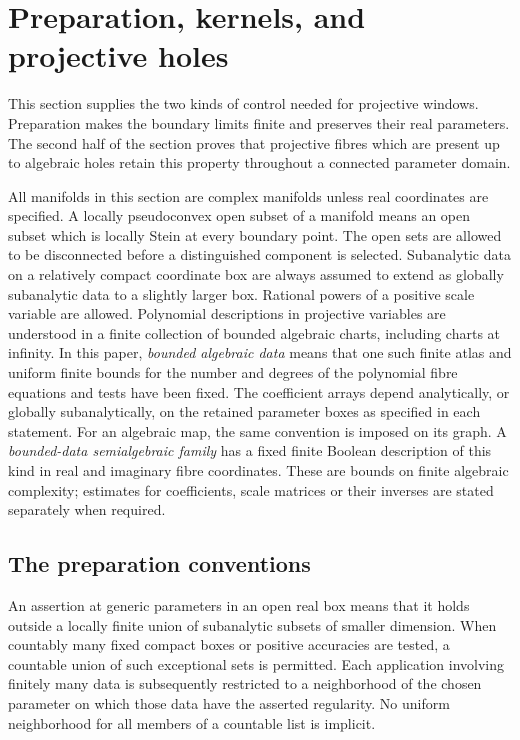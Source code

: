 \section{Preparation, kernels, and projective holes}
\label{prep:section}

This section supplies the two kinds of control needed for projective
windows. Preparation makes the boundary limits finite and preserves
their real parameters. The second half of the section proves that
projective fibres which are present up to algebraic holes retain this
property throughout a connected parameter domain.

All manifolds in this section are complex manifolds unless real coordinates
are specified. A locally pseudoconvex open subset of a manifold means an
open subset which is locally Stein at every boundary point. The open sets are
allowed to be disconnected before a distinguished component is selected.
Subanalytic data on a relatively compact coordinate box are always assumed
to extend as globally subanalytic data to a slightly larger box. Rational
powers of a positive scale variable are allowed. Polynomial descriptions
in projective variables are understood in a finite collection of bounded
algebraic charts, including charts at infinity. In this paper,
\emph{bounded algebraic data} means that one such finite atlas and
uniform finite bounds for the number and degrees of the polynomial
fibre equations and tests have been fixed. The coefficient arrays
depend analytically, or globally subanalytically, on the retained
parameter boxes as specified in each statement. For an algebraic
map, the same convention is imposed on its graph. A \emph{bounded-data
semialgebraic family} has a fixed finite Boolean description of this
kind in real and imaginary fibre coordinates. These are bounds on
finite algebraic complexity; estimates for coefficients, scale
matrices or their inverses are stated separately when required.

\subsection{The preparation conventions}

\begin{definition}\label{prep:generic}
An assertion at generic parameters in an open real box means that it holds
outside a locally finite union of subanalytic subsets of smaller dimension.
When countably many fixed compact boxes or positive accuracies are tested,
a countable union of such exceptional sets is permitted. Each application
involving finitely many data is subsequently restricted to a neighborhood
of the chosen parameter on which those data have the asserted regularity.
No uniform neighborhood for all members of a countable list is implicit.
\end{definition}

